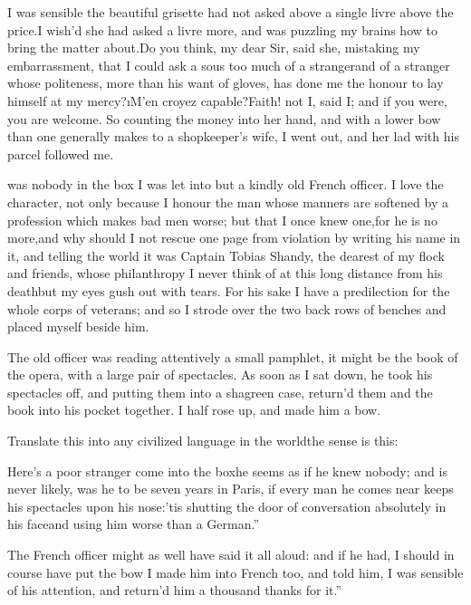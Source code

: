 \documentclass[twoside]{article}
\begin{document}
I was sensible the beautiful grisette had not asked above a single livre
above the price.\tsk I wish’d she had asked a livre more, and was puzzling my
brains how to bring the matter about.\tsk Do you think, my dear Sir, said
she, mistaking my embarrassment, that I could ask a sous too much of a
stranger\tsk and of a stranger whose politeness, more than his want of
gloves, has done me the honour to lay himself at my mercy?\tsk \i{M’en croyez
capable}?\tsk Faith! not I, said I; and if you were, you are welcome.  So
counting the money into her hand, and with a lower bow than one generally
makes to a shopkeeper’s wife, I went out, and her lad with his parcel
followed me.






 was nobody in the box I was let into but a kindly old French
officer.  I love the character, not only because I honour the man whose
manners are softened by a profession which makes bad men worse; but that
I once knew one,\tsk for he is no more,\tsk and why should I not rescue one page
from violation by writing his name in it, and telling the world it was
Captain Tobias Shandy, the dearest of my flock and friends, whose
philanthropy I never think of at this long distance from his death\tsk but my
eyes gush out with tears.  For his sake I have a predilection for the
whole corps of veterans; and so I strode over the two back rows of
benches and placed myself beside him.

The old officer was reading attentively a small pamphlet, it might be the
book of the opera, with a large pair of spectacles.  As soon as I sat
down, he took his spectacles off, and putting them into a shagreen case,
return’d them and the book into his pocket together.  I half rose up, and
made him a bow.

Translate this into any civilized language in the world\tsk the sense is
this:

\lqq Here’s a poor stranger come into the box\tsk he seems as if he knew nobody;
and is never likely, was he to be seven years in Paris, if every man he
comes near keeps his spectacles upon his nose:\tsk ’tis shutting the door of
conversation absolutely in his face\tsk and using him worse than a German.”

The French officer might as well have said it all aloud: and if he had, I
should in course have put the bow I made him into French too, and told
him, \lqq I was sensible of his attention, and return’d him a thousand thanks
for it.”
\end{document}
